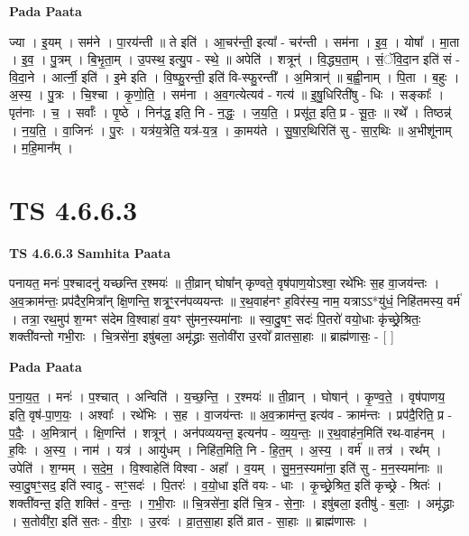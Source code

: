 \documentclass[17pt]{extarticle}
\begin{document}
\textbf{Pada Paata} \newline

ज्या । इ॒यम् । सम॑ने । पा॒रय॑न्ती ॥ ते इति॑ । आ॒चर॑न्ती॒ इत्या᳚ - चर॑न्ती । सम॑ना । इ॒व॒ । योषा᳚ । मा॒ता । इ॒व॒ । पु॒त्रम् । बि॒भृ॒ता॒म् । उ॒पस्थ॒ इत्यु॒प - स्थे॒ ॥ अपेति॑ । शत्रून्॑ । वि॒द्ध्य॒ता॒म् । सं॒ॅवि॒दा॒न इति॑ सं - वि॒दा॒ने । आर्त्नी॒ इति॑ । इ॒मे इति । वि॒ष्फु॒रन्ती॒ इति॑ वि-स्फु॒रन्ती᳚ । अ॒मित्रान्॑ ॥ ब॒ह्वी॒नाम् । पि॒ता । ब॒हुः । अ॒स्य॒ । पु॒त्रः । चि॒श्चा । कृ॒णो॒ति॒ । सम॑ना । अ॒व॒गत्येत्यव॑ - गत्य॑ ॥ इ॒षु॒धिरिती॑षु - धिः । सङ्काः᳚ । पृत॑नाः । च॒ । सर्वाः᳚ । पृ॒ष्ठे । निन॑द्ध॒ इति॒ नि - न॒द्धः॒ । ज॒य॒ति॒ । प्रसू॑त॒ इति॒ प्र - सू॒तः॒ ॥ रथे᳚ । तिष्ठन्न्॑ । न॒य॒ति॒ । वा॒जिनः॑ । पु॒रः । यत्र॑य॒त्रेति॒ यत्र॑-य॒त्र॒ । का॒मय॑ते । सु॒षा॒र॒थिरिति॑ सु - सा॒र॒थिः ॥ अ॒भीशू॑नाम् । म॒हि॒मान᳚म् ।  \newline




\section*{ TS 4.6.6.3 }

\textbf{TS 4.6.6.3 } \newline
\textbf{Samhita Paata} \newline

पनायत॒ मनः॑ प॒श्चादनु॑ यच्छन्ति र॒श्मयः॑ ॥ ती॒व्रान् घोषा᳚न् कृण्वते॒ वृष॑पाण॒योऽश्वा॒ रथे॑भिः स॒ह वा॒जय॑न्तः । अ॒व॒क्राम॑न्तः॒ प्रप॑दैर॒मित्रा᳚न् क्षि॒णन्ति॒ शत्रूꣳ॒॒रन॑पव्ययन्तः ॥ र॒थ॒वाह॑नꣳ ह॒विर॑स्य॒ नाम॒ यत्राऽऽ*यु॑धं॒ निहि॑तमस्य॒ वर्म॑ । तत्रा॒ रथ॒मुप॑ श॒ग्मꣳ स॑देम वि॒श्वाहा॑ व॒यꣳ सु॑मन॒स्यमा॑नाः ॥ स्वा॒दु॒षꣳ॒॒ सदः॑ पि॒तरो॑ वयो॒धाः कृ॑च्छ्रे॒श्रितः॒ शक्ती॑वन्तो गभी॒राः । चि॒त्रसे॑ना॒ इषु॑बला॒ अमृ॑द्ध्राः स॒तोवी॑रा उ॒रवो᳚ व्रातसा॒हाः ॥ ब्राह्म॑णासः॒ - [  ] \newline

\textbf{Pada Paata} \newline

प॒ना॒य॒त॒ । मनः॑ । प॒श्चात् । अन्विति॑ । य॒च्छ॒न्ति॒ । र॒श्मयः॑ ॥ ती॒व्रान् । घोषान्॑ । कृ॒ण्व॒ते॒ । वृष॑पाणय॒ इति॒ वृष॑-पा॒ण॒यः॒ । अश्वाः᳚ । रथे॑भिः । स॒ह । वा॒जय॑न्तः ॥ अ॒व॒क्राम॑न्त॒ इत्य॑व - क्राम॑न्तः । प्रप॑दै॒रिति॒ प्र - प॒दैः॒ । अ॒मित्रान्॑ । क्षि॒णन्ति॑ । शत्रून्॑ । अन॑पव्ययन्त॒ इत्यन॑प - व्य॒य॒न्तः॒ ॥ र॒थ॒वाह॑न॒मिति॑ रथ-वाह॑नम् । ह॒विः । अ॒स्य॒ । नाम॑ । यत्र॑ । आयु॑धम् । निहि॑त॒मिति॒ नि - हि॒त॒म् । अ॒स्य॒ । वर्म॑ ॥ तत्र॑ । रथ᳚म् । उपेति॑ । श॒ग्मम् । स॒दे॒म॒ । वि॒श्वाहेति॑ विश्वा - अहा᳚ । व॒यम् । सु॒म॒न॒स्यमा॑ना॒ इति॑ सु - म॒न॒स्यमा॑नाः ॥ स्वा॒दु॒षꣳ॒॒सद॒ इति॑ स्वादु - सꣳ॒॒सदः॑ । पि॒तरः॑ । व॒यो॒धा इति॑ वयः - धाः । कृ॒च्छ्रे॒श्रित॒ इति॑ कृच्छ्रे - श्रितः॑ । शक्ती॑वन्त॒ इति॒ शक्ति॑ - व॒न्तः॒ । ग॒भी॒राः ॥ चि॒त्रसे॑ना॒ इति॑ चि॒त्र - से॒नाः॒ । इषु॑बला॒ इतीषु॑ - ब॒लाः॒ । अमृ॑द्ध्राः । स॒तोवी॑रा॒ इति॑ स॒तः - वी॒राः॒ । उ॒रवः॑ । व्रा॒त॒सा॒हा इति॑ व्रात - सा॒हाः ॥ ब्राह्म॑णासः ।  \newline
\end{document}
